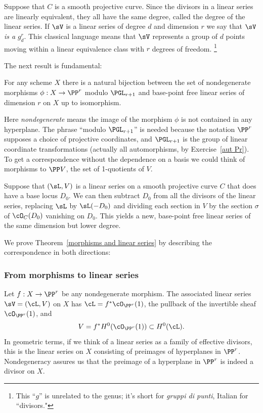 Suppose that $C$ is a smooth projective curve. Since the divisors in a linear series are linearly equivalent, they all have the same
degree, called the degree of the linear series. If $\sV$ is a linear
series of degree $d$ and dimension $r$ we say that \emph{$\sV$ is a}
$g^r_d$.
%
This classical  language means that $\sV$
represents a group of $d$
points moving within a linear equivalence class with $r$ degrees
of freedom.%
\footnote{
This ``$g$'' is unrelated to the genus;
it's short for \emph{gruppi di punti}, Italian for ``divisors."}

The next result is fundamental:

\begin{theorem}\label{morphisms and linear series}
For any scheme $X$ there is a natural bijection between the set of
nondegenerate morphisms $\phi : X \to \PP^r$ modulo $\PGL_{r+1}$ and
base-point free linear series of dimension $r$ on $X$ up to isomorphism.
\end{theorem}

Here \emph{nondegenerate} means the image of the morphism $\phi$ is
not contained in any hyperplane. The phrase ``modulo $\PGL_{r+1}$'' is
needed because the notation $\PP^r$ supposes a choice of projective
coordinates, and
$\PGL_{r+1}$ is the group of linear coordinate transformations (actually all automorphisms, by Exercise~\ref{aut Pr}).
To get a correspondence without the dependence on a basis we could think of morphisms to $\PP V$, the set of 1-quotients of $V$.

Suppose that $(\sL, V)$ is a linear series on a smooth projective curve $C$ that does have a base locus $D_0$. We can then subtract $D_0$ from all the divisors of the linear series, replacing $\sL$ by $\sL(-D_0)$ and dividing each section in $V$
by the section $\sigma$ of $\cO_C(D_0)$ vanishing on $D_0$.
This yields
a new, base-point free linear series of the same dimension
but lower degree.

We prove
Theorem~\ref{morphisms and linear series}
by describing the correspondence in both directions:

\subsubsection*{From morphisms to linear series}
Let
$f : X \to \PP^r$ be any nondegenerate morphism. The associated linear series $\sV = (\cL, V)$ on $X$ has $\cL = f^*\cO_{\PP^r}(1)$, the pullback of the invertible sheaf $\cO_{\PP^r}(1)$, and
$$
V = f^*H^0(\cO_{\PP^r}(1)) \subset H^0(\cL).
$$
In geometric terms, if we think of a linear series as a family of
effective divisors, this is the linear series on $X$ consisting of
preimages of hyperplanes in $\PP^r$.
Nondegeneracy assures us that the preimage of
a hyperplane in $\PP^r$ is indeed a divisor on $X$.

